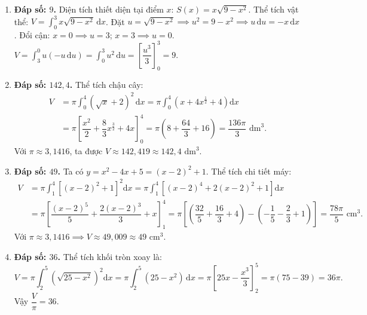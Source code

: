 \documentclass[12pt,a4paper]{article}
\begin{document}
\begin{enumerate}[start=16]
\item \textbf{Đáp số: $9$.}  
Diện tích thiết diện tại điểm $x$: $S(x) = x\sqrt{9 - x^2}$.  
Thể tích vật thể: $V = \int_0^3 x\sqrt{9 - x^2}\,\mathrm{d}x$.  
Đặt $u = \sqrt{9 - x^2} \implies u^2 = 9 - x^2 \implies u\,\mathrm{d}u = -x\,\mathrm{d}x$.  
Đổi cận: $x = 0 \implies u = 3$; $x = 3 \implies u = 0$.  
$V = \int_3^0 u(-u\,\mathrm{d}u) = \int_0^3 u^2\,\mathrm{d}u = \left[\dfrac{u^3}{3}\right]_0^3 = 9$.

\item \textbf{Đáp số: $142{,}4$.}  
Thể tích chậu cây:  
\begin{align*}
V &= \pi \int_0^4 (\sqrt{x} + 2)^2\,\mathrm{d}x = \pi \int_0^4 \left(x + 4x^{\frac{1}{2}} + 4\right)\mathrm{d}x \\
  &= \pi\left[\dfrac{x^2}{2} + \dfrac{8}{3}x^{\frac{3}{2}} + 4x\right]_0^4 = \pi\left(8 + \dfrac{64}{3} + 16\right) = \dfrac{136\pi}{3}\text{ dm}^3.
\end{align*}
Với $\pi \approx 3{,}1416$, ta được $V \approx 142{,}419 \approx 142{,}4\text{ dm}^3$.

\item \textbf{Đáp số: $49$.}  
Ta có $y = x^2 - 4x + 5 = (x - 2)^2 + 1$. Thể tích chi tiết máy:  
\begin{align*}
V &= \pi \int_1^4 \left[(x - 2)^2 + 1\right]^2\mathrm{d}x = \pi \int_1^4 \left[(x - 2)^4 + 2(x - 2)^2 + 1\right]\mathrm{d}x \\
  &= \pi \left[\dfrac{(x - 2)^5}{5} + \dfrac{2(x - 2)^3}{3} + x\right]_1^4 = \pi\left[\left(\dfrac{32}{5} + \dfrac{16}{3} + 4\right) - \left(-\dfrac{1}{5} - \dfrac{2}{3} + 1\right)\right] = \dfrac{78\pi}{5}\text{ cm}^3.
\end{align*}
Với $\pi \approx 3{,}1416 \implies V \approx 49{,}009 \approx 49\text{ cm}^3$.

\item \textbf{Đáp số: $36$.}  
Thể tích khối tròn xoay là:  
\[
V = \pi \int_2^5 \left(\sqrt{25 - x^2}\right)^2\mathrm{d}x = \pi \int_2^5 (25 - x^2)\,\mathrm{d}x = \pi \left[25x - \dfrac{x^3}{3}\right]_2^5 = \pi(75 - 39) = 36\pi.
\]
Vậy $\dfrac{V}{\pi} = 36$.
\end{enumerate}
\end{document}
